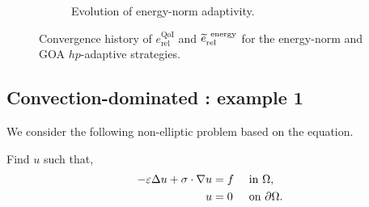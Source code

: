\begin{figure*}[t!]
\begin{subfigure}[t]{0.5\textwidth}
    \caption{Evolution of energy-norm adaptivity.}
    \label{subfig:compaenergy}
  \end{subfigure}
  \caption{Convergence history of $e_{\textrm{rel}}^{\textrm{QoI}}$ and $\tilde{e}_{\textrm{rel}}^{\textrm{\, energy}}$ for the energy-norm and GOA $hp$-adaptive strategies.}
  \label{fig:comparison}
\end{figure*}

\pagebreak

\subsection{Convection-dominated : example 1}
We consider the following non-elliptic problem based on the  equation.
\begin{var_for}
  Find $u$ such that,
  \begin{alignat}{2}
    -\eps \Delta u + \sigma \cdot \grad u & = f &  & \text{ in } \Omega, \label{eq:convection} \\
    u                                     & =0  &  & \text{ on } {\partial \Omega}. \nonumber
  \end{alignat}
\end{var_for}

